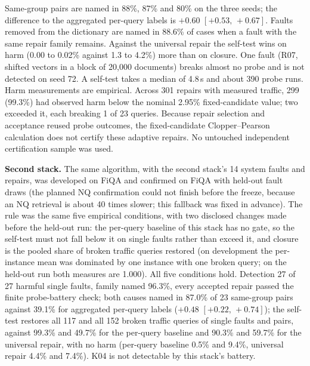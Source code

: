 \documentclass[conference]{IEEEtran}
\newcommand{\ci}[2]{[#1,\,#2]}
\begin{document}
Same-group pairs are named in 88\%, 87\% and 80\% on the three seeds; the difference to the aggregated per-query labels is $+0.60$ $\ci{+0.53}{+0.67}$. Faults removed from the dictionary are named in 88.6\% of cases when a fault with the same repair family remains. Against the universal repair the self-test wins on harm (0.00 to 0.02\% against 1.3 to 4.2\%) more than on closure. One fault (R07, shifted vectors in a block of 20{,}000 documents) breaks almost no probe and is not detected on seed 72. A self-test takes a median of 4.8\,s and about 390 probe runs. Harm measurements are empirical. Across 301 repairs with measured traffic, 299 (99.3\%) had observed harm below the nominal 2.95\% fixed-candidate value; two exceeded it, each breaking 1 of 23 queries. Because repair selection and acceptance reused probe outcomes, the fixed-candidate Clopper--Pearson calculation does not certify these adaptive repairs. No untouched independent certification sample was used.

\textbf{Second stack.} The same algorithm, with the second stack's 14 system faults and repairs, was developed on FiQA and confirmed on FiQA with held-out fault draws (the planned NQ confirmation could not finish before the freeze, because an NQ retrieval is about 40 times slower; this fallback was fixed in advance). The rule was the same five empirical conditions, with two disclosed changes made before the held-out run: the per-query baseline of this stack has no gate, so the self-test must not fall below it on single faults rather than exceed it, and closure is the pooled share of broken traffic queries restored (on development the per-instance mean was dominated by one instance with one broken query; on the held-out run both measures are 1.000). All five conditions hold. Detection 27 of 27 harmful single faults, family named 96.3\%, every accepted repair passed the finite probe-battery check; both causes named in 87.0\% of 23 same-group pairs against 39.1\% for aggregated per-query labels ($+0.48$ $\ci{+0.22}{+0.74}$); the self-test restores all 117 and all 152 broken traffic queries of single faults and pairs, against 99.3\% and 49.7\% for the per-query baseline and 90.3\% and 59.7\% for the universal repair, with no harm (per-query baseline 0.5\% and 9.4\%, universal repair 4.4\% and 7.4\%). K04 is not detectable by this stack's battery.
\end{document}
